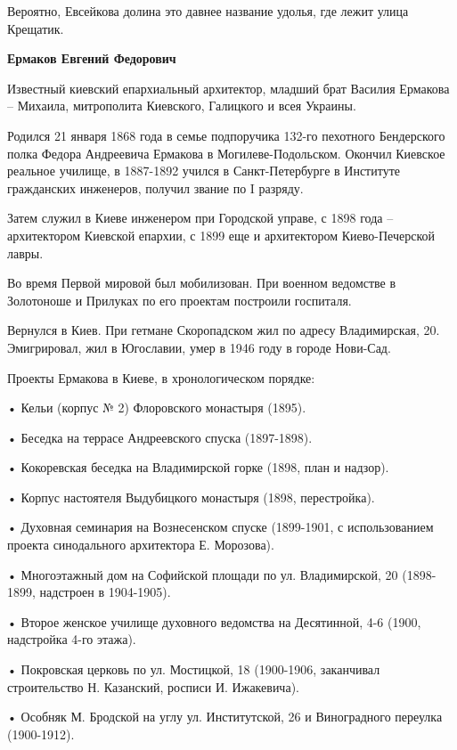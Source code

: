 Вероятно, Евсейкова долина это давнее название удолья, где лежит улица Крещатик.\\

\medskip

\textbf{Ермаков Евгений Федорович} 

Известный киевский епархиальный архитектор, младший брат Василия Ермакова – Михаила, митрополита Киевского, Галицкого и всея Украины.

Родился  21 января 1868 года в семье подпоручика 132-го пехотного Бендерского полка Федора Андреевича Ермакова в Могилеве-Подольском. Окончил Киевское реальное училище, в 1887-1892 учился в Санкт-Петербурге в Институте гражданских инженеров, получил звание по I разряду.

Затем служил в Киеве инженером при Городской управе, с 1898 года – архитектором Киевской епархии, с 1899 еще и архитектором Киево-Печерской лавры.

Во время Первой мировой был мобилизован. При военном ведомстве в Золотоноше и Прилуках по его проектам построили госпиталя.

Вернулся в Киев. При гетмане Скоропадском жил по адресу Владимирская, 20. Эмигрировал, жил в Югославии, умер в 1946 году в городе Нови-Сад.

Проекты Ермакова в Киеве, в хронологическом порядке:

\noindent • Кельи (корпус № 2) Флоровского монастыря (1895).

\noindent • Беседка на террасе Андреевского спуска (1897-1898).

\noindent • Кокоревская беседка на Владимирской горке (1898, план и надзор).

\noindent • Корпус настоятеля Выдубицкого монастыря (1898, перестройка).

\noindent • Духовная семинария на Вознесенском спуске (1899-1901, с использованием проекта синодального архитектора Е. Морозова).

\noindent • Многоэтажный дом на Софийской площади по ул. Владимирской, 20 (1898-1899, надстроен в 1904-1905).

\noindent • Второе женское училище духовного ведомства на Десятинной, 4-6 (1900, надстройка 4-го этажа).

\noindent • Покровская церковь по ул. Мостицкой, 18 (1900-1906, заканчивал строительство Н. Казанский, росписи И. Ижакевича).

\noindent • Особняк М. Бродской на углу ул. Институтской, 26 и Виноградного переулка (1900-1912).

